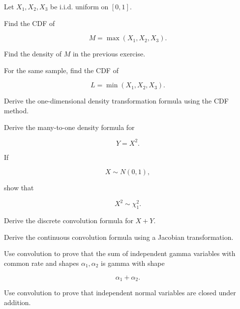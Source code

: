 \begin{exercise}[2]
Let \(X_1,X_2,X_3\) be i.i.d. uniform on \([0,1]\).

Find the CDF of

\[
M=\max(X_1,X_2,X_3).
\]
\end{exercise}

\begin{exercise}[2]
Find the density of \(M\) in the previous exercise.
\end{exercise}

\begin{exercise}[2]
For the same sample, find the CDF of

\[
L=\min(X_1,X_2,X_3).
\]
\end{exercise}

\begin{exercise}[3]
Derive the one-dimensional density transformation formula using the
CDF method.
\end{exercise}

\begin{exercise}[3]
Derive the many-to-one density formula for

\[
Y=X^2.
\]
\end{exercise}

\begin{exercise}[3]
If

\[
X\sim N(0,1),
\]

show that

\[
X^2\sim\chi^2_1.
\]
\end{exercise}

\begin{exercise}[3]
Derive the discrete convolution formula for \(X+Y\).
\end{exercise}

\begin{exercise}[3]
Derive the continuous convolution formula using a Jacobian
transformation.
\end{exercise}

\begin{exercise}[3]
Use convolution to prove that the sum of independent gamma variables
with common rate and shapes \(\alpha_1,\alpha_2\) is gamma with shape

\[
\alpha_1+\alpha_2.
\]
\end{exercise}

\begin{exercise}[3]
Use convolution to prove that independent normal variables are closed
under addition.
\end{exercise}

